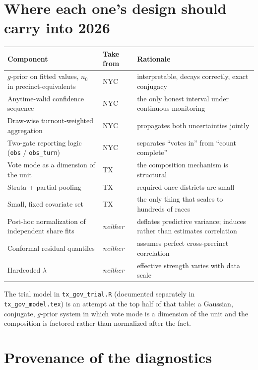\documentclass[11pt]{article}
\begin{document}
\section{Where each one's design should carry into 2026}\label{sec:impl}

\begin{table}[ht]
\centering
\small
\begin{tabular}{@{}L{5.6cm}L{3.3cm}L{3.3cm}@{}}
\toprule
Component & Take from & Rationale \\
\midrule
$g$-prior on fitted values, $n_0$ in precinct-equivalents & NYC & interpretable, decays correctly, exact conjugacy \\
Anytime-valid confidence sequence & NYC & the only honest interval under continuous monitoring \\
Draw-wise turnout-weighted aggregation & NYC & propagates both uncertainties jointly \\
Two-gate reporting logic (\texttt{obs} / \texttt{obs\_turn}) & NYC & separates ``votes in'' from ``count complete'' \\
Vote mode as a dimension of the unit & TX & the composition mechanism is structural \\
Strata + partial pooling & TX & required once districts are small \\
Small, fixed covariate set & TX & the only thing that scales to hundreds of races \\
\midrule
Post-hoc normalization of independent share fits & \emph{neither} & deflates predictive variance; induces rather than estimates correlation \\
Conformal residual quantiles & \emph{neither} & assumes perfect cross-precinct correlation \\
Hardcoded $\lambda$ & \emph{neither} & effective strength varies with data scale \\
\bottomrule
\end{tabular}
\end{table}

\noindent The trial model in \texttt{tx\_gov\_trial.R} (documented separately in
\texttt{tx\_gov\_model.tex}) is an attempt at the top half of that table: a Gaussian,
conjugate, $g$-prior system in which vote mode is a dimension of the unit and the
composition is factored rather than normalized after the fact.

\section{Provenance of the diagnostics}\label{sec:prov}
\end{document}
